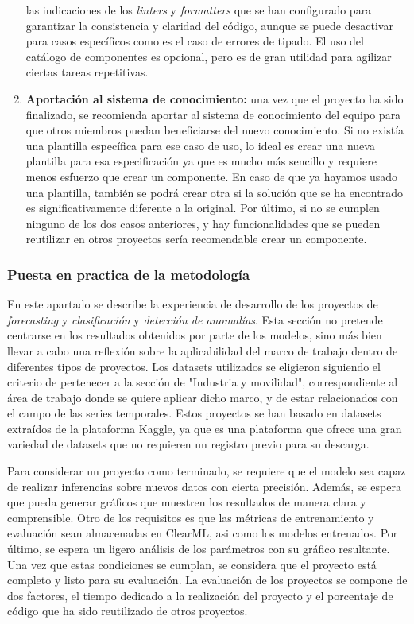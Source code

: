 \begin{enumerate}
    las indicaciones de los \textit{linters} y \textit{formatters} que se han configurado
    para garantizar la consistencia y claridad del código, aunque se puede desactivar
    para casos específicos como es el caso de errores de tipado. El uso del catálogo
    de componentes es opcional, pero es de gran utilidad para agilizar ciertas tareas
    repetitivas.
    \item \textbf{Aportación al sistema de conocimiento:} una vez que el proyecto
    ha sido finalizado, se recomienda aportar al sistema de conocimiento del equipo
    para que otros miembros puedan beneficiarse del nuevo conocimiento. Si
    no existía una plantilla específica para ese caso de uso, lo ideal es crear
    una nueva plantilla para esa especificación ya que es mucho más sencillo
    y requiere menos esfuerzo que crear un componente. En caso de que ya hayamos
    usado una plantilla, también se podrá crear otra si la solución que
    se ha encontrado es significativamente diferente a la original. Por último,
    si no se cumplen ninguno de los dos casos anteriores, y hay funcionalidades
    que se pueden reutilizar en otros proyectos sería recomendable crear un
    componente.
\end{enumerate}


\subsubsection{Puesta en practica de la metodología}
En este apartado se describe la experiencia de desarrollo de
los proyectos de \textit{forecasting} y \textit{clasificación} y \textit{detección de anomalías}.
Esta sección no pretende centrarse en los resultados obtenidos por parte de los modelos, sino
más bien llevar a cabo una reflexión sobre la aplicabilidad del marco de trabajo
dentro de diferentes tipos de proyectos. Los datasets utilizados se eligieron siguiendo el criterio de 
pertenecer a la sección de "Industria y movilidad", correspondiente al área de trabajo donde 
se quiere aplicar dicho marco, y de estar relacionados con el campo 
de las series temporales. Estos proyectos se han basado en datasets extraídos de la plataforma Kaggle, 
ya que es una plataforma que ofrece una gran variedad de datasets que no requieren un registro previo para su descarga.\medskip

Para considerar un proyecto como terminado, se requiere que el modelo sea capaz de realizar inferencias 
sobre nuevos datos con cierta precisión. Además, se espera que pueda generar gráficos que muestren los 
resultados de manera clara y comprensible. Otro de los requisitos es que las métricas de entrenamiento
y evaluación sean almacenadas en ClearML, asi como los modelos entrenados. Por último, se espera un ligero
análisis de los parámetros con su gráfico resultante. Una vez que estas condiciones se cumplan, 
se considera que el proyecto está completo y listo para su evaluación. La evaluación de los proyectos
se compone de dos factores, el tiempo dedicado a la realización del proyecto y el porcentaje de código
que ha sido reutilizado de otros proyectos.

